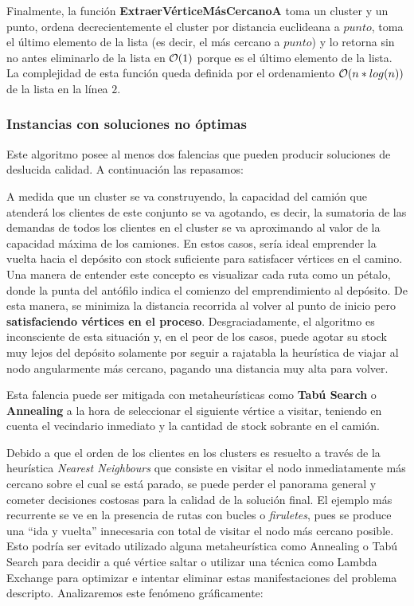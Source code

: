 
Finalmente, la función \textbf{ExtraerVérticeMásCercanoA} toma un cluster y un punto, ordena decrecientemente el cluster por distancia euclideana a $punto$, toma el último elemento de la lista (es decir, el más cercano a $punto$) y lo retorna sin no antes eliminarlo de la lista en $\mathcal{O}(1)$ porque es el último elemento de la lista. La complejidad de esta función queda definida por el ordenamiento $\mathcal{O}(n*log(n))$ de la lista en la línea $2$.

\subsubsection{Instancias con soluciones no óptimas}
Este algoritmo posee al menos dos falencias que pueden producir soluciones de deslucida calidad. A continuación las repasamos:

A medida que un cluster se va construyendo, la capacidad del camión que atenderá los clientes de este conjunto se va agotando, es decir, la sumatoria de las demandas de todos los clientes en el cluster se va aproximando al valor de la capacidad máxima de los camiones. En estos casos, sería ideal emprender la vuelta hacia el depósito con stock suficiente para satisfacer vértices en el camino. Una manera de entender este concepto es visualizar cada ruta como un pétalo, donde la punta del antófilo indica el comienzo del emprendimiento al depósito. De esta manera, se minimiza la distancia recorrida al volver al punto de inicio pero \textbf{satisfaciendo vértices en el proceso}. Desgraciadamente, el algoritmo es inconsciente de esta situación y, en el peor de los casos, puede agotar su stock muy lejos del depósito solamente por seguir a rajatabla la heurística de viajar al nodo angularmente más cercano, pagando una distancia muy alta para volver.

\vskip 8pt

Esta falencia puede ser mitigada con metaheurísticas como \textbf{Tabú Search} o \textbf{Annealing} a la hora de seleccionar el siguiente vértice a visitar, teniendo en cuenta el vecindario inmediato y la cantidad de stock sobrante en el camión.

Debido a que el orden de los clientes en los clusters es resuelto a través de la heurística \textit{Nearest Neighbours} que consiste en visitar el nodo inmediatamente más cercano sobre el cual se está parado, se puede perder el panorama general y cometer decisiones costosas para la calidad de la solución final. El ejemplo más recurrente se ve en la presencia de rutas con bucles o \textit{firuletes}, pues se produce una ``ida y vuelta'' innecesaria con total de visitar el nodo más cercano posible. Esto podría ser evitado utilizado alguna metaheurística como Annealing o Tabú Search para decidir a qué vértice saltar o utilizar una técnica como Lambda Exchange para optimizar e intentar eliminar estas manifestaciones del problema descripto. Analizaremos este fenómeno gráficamente: